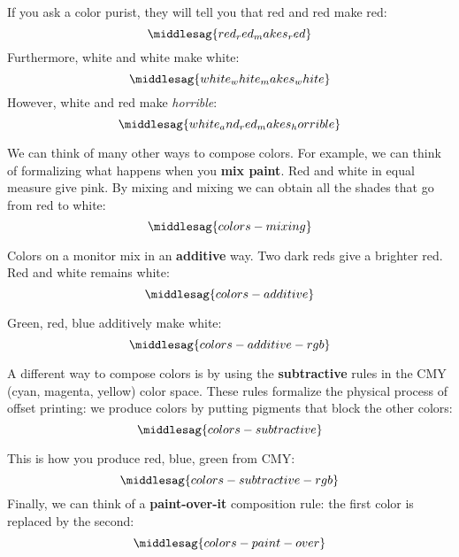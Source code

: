 If you ask a color purist, they will tell you that red and red make red:
%
\begin{equation}
    \middlesag{red_red_makes_red}
\end{equation}
%
Furthermore, white and white make white:
%
\begin{equation}
    \middlesag{white_white_makes_white}
\end{equation}
%
However, white and red make \emph{horrible}:
%
\begin{equation}
    \middlesag{white_and_red_makes_horrible}
\end{equation}


We can think of many other ways to compose colors.
For example, we can think of formalizing what happens when you \textbf{mix paint}.
Red and white in equal measure give pink.
By mixing and mixing we can obtain all the shades that go from red to white:
%
\begin{equation}
    \label{eq:colors-mixing}
    \middlesag{colors-mixing}
\end{equation}

Colors on a monitor mix in an \textbf{additive} way.
Two dark reds give a brighter red.
Red and white remains white:
%
\begin{equation}
    \label{eq:colors-additive}
    \middlesag{colors-additive}
\end{equation}

Green, red, blue additively make white:
%
\begin{equation}
    \label{eq:colors-additive-rgb}
    \middlesag{colors-additive-rgb}
\end{equation}

A different way to compose colors is by using the \textbf{subtractive} rules in the CMY (cyan, magenta, yellow) color space.
These rules formalize the physical process of offset printing: we produce colors by putting pigments that block the other colors:
%
\begin{equation}
    \label{eq:colors_subtractive}
    \middlesag{colors-subtractive}
\end{equation}

This is how you produce red, blue, green from CMY:
%
\begin{equation}
    \label{eq:colors-subtractive-rgb}
    \middlesag{colors-subtractive-rgb}
\end{equation}
%
Finally, we can think of a \textbf{paint-over-it} composition rule: the first color is replaced by the second:
%
\begin{equation}
    \label{eq:colors-paint-over}
    \middlesag{colors-paint-over}
\end{equation}


